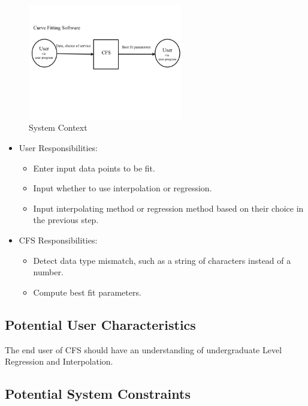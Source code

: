 \documentclass[12pt]{article}
\newcommand{\famname}{CFS} %
\begin{document}
\begin{figure}[h!]
	\begin{center}
		\includegraphics[width=0.6\textwidth]{SystemContextFigure}
		\caption{System Context}
		\label{Fig_SystemContext} 
	\end{center}
\end{figure}
\begin{itemize}
\item User Responsibilities:
\begin{itemize}
\item Enter input data points to be fit.
\item Input whether to use interpolation or regression.
\item Input interpolating method or regression method based on their choice in the previous step. 
\end{itemize}
\item \famname{} Responsibilities:
\begin{itemize}
\item Detect data type mismatch, such as a string of characters instead of a number.
\item Compute best fit parameters.
\end{itemize}
\end{itemize}

\subsection{Potential User Characteristics} \label{SecUserCharacteristics}

The end user of \famname{} should have an understanding of undergraduate Level Regression and Interpolation.

\subsection{Potential System Constraints}
\end{document}
